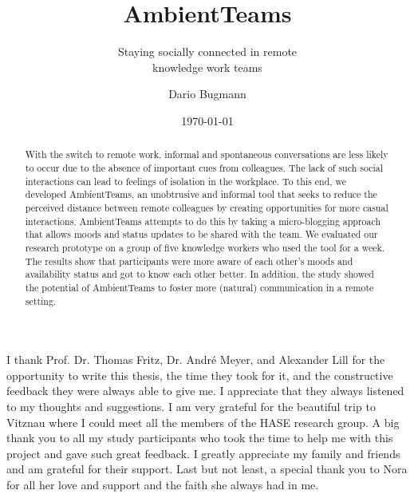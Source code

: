 \documentclass{seal_thesis}
\date{\today}
\title{AmbientTeams}
\subtitle{Staying socially connected in remote \\ knowledge work teams}
\author{Dario Bugmann}
\begin{document}
\maketitle

\frontmatter

\begin{acknowledgements}
    I thank Prof. Dr. Thomas Fritz, Dr. André Meyer, and Alexander Lill for the opportunity to write this thesis, the time they took for it, and the constructive feedback they were always able to give me. I appreciate that they always listened to my thoughts and suggestions. I am very grateful for the beautiful trip to Vitznau where I could meet all the members of the HASE research group. A big thank you to all my study participants who took the time to help me with this project and gave such great feedback. I greatly appreciate my family and friends and am grateful for their support. Last but not least, a special thank you to Nora for all her love and support and the faith she always had in me.
\end{acknowledgements}

\begin{abstract}
    With the switch to remote work, informal and spontaneous conversations are less likely to occur due to the absence of important cues from colleagues. The lack of such social interactions can lead to feelings of isolation in the workplace. To this end, we developed AmbientTeams, an unobtrusive and informal tool that seeks to reduce the perceived distance between remote colleagues by creating opportunities for more casual interactions. AmbientTeams attempts to do this by taking a micro-blogging approach that allows moods and status updates to be shared with the team. We evaluated our research prototype on a group of five knowledge workers who used the tool for a week. The results show that participants were more aware of each other's moods and availability status and got to know each other better. In addition, the study showed the potential of AmbientTeams to foster more (natural) communication in a remote setting.
\end{abstract}
\end{document}
